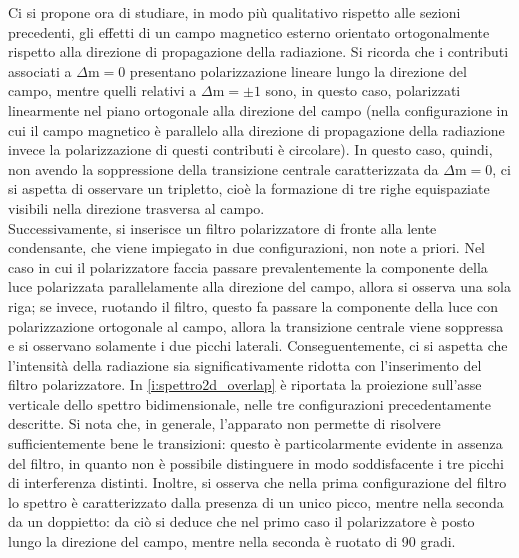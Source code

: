 \documentclass[twocolumn,10pt]{asme2ej}
\begin{document}
Ci si propone ora di studiare, in modo più qualitativo rispetto alle sezioni precedenti, gli effetti di un campo
magnetico esterno orientato ortogonalmente rispetto alla direzione di propagazione della radiazione. Si  ricorda che i
contributi associati a $\Delta \text{m} = 0$ presentano polarizzazione lineare lungo la direzione del campo, mentre
quelli relativi a $\Delta \text{m} = \pm 1$ sono, in questo caso, polarizzati linearmente nel piano ortogonale alla
direzione del campo (nella configurazione in cui il campo magnetico è parallelo alla direzione di propagazione della
radiazione invece la polarizzazione di questi contributi è circolare). In questo caso, quindi, non avendo la soppressione della transizione centrale caratterizzata da $\Delta
\text{m} = 0$, ci si aspetta di osservare un tripletto, cioè la formazione di tre righe equispaziate visibili nella
direzione trasversa al campo. \\
Successivamente, si inserisce un filtro polarizzatore di fronte alla lente condensante, che viene impiegato in due
configurazioni, non note a priori. Nel caso in cui il polarizzatore faccia passare prevalentemente la componente della
luce polarizzata parallelamente alla direzione del campo, allora si osserva una sola riga; se invece, ruotando il
filtro, questo fa passare la componente della luce con polarizzazione ortogonale al campo, allora la transizione
centrale viene soppressa e si osservano solamente i due picchi laterali. Conseguentemente, ci si aspetta che l'intensità
della radiazione sia significativamente ridotta con l'inserimento del filtro polarizzatore.  
In \autoref{i:spettro2d_overlap} è riportata la proiezione sull'asse verticale dello spettro bidimensionale, nelle tre
configurazioni precedentamente descritte. Si nota che, in generale, l'apparato non permette di risolvere
sufficientemente bene le transizioni: questo è particolarmente evidente in assenza del filtro, in quanto non è possibile
distinguere in modo soddisfacente i tre picchi di interferenza distinti. Inoltre, si osserva che nella prima
configurazione del filtro lo spettro è caratterizzato dalla presenza di un unico picco, mentre nella seconda da un
doppietto: da ciò si deduce che nel primo caso il polarizzatore è posto lungo la direzione del campo, mentre nella
seconda è ruotato di 90 gradi. 
\end{document}

